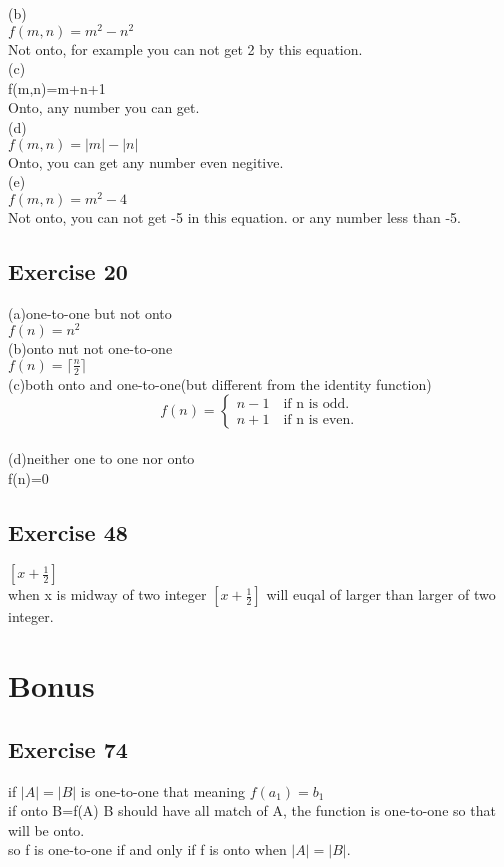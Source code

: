 \documentclass[12pt]{article}
\begin{document}
(b)\\
$f(m,n)=m^2-n^2$\\
Not onto, for example you can not get 2 by this equation.\\

(c)\\
f(m,n)=m+n+1\\
Onto, any number you can get.\\

(d)\\
$f(m,n)=|m|-|n|$\\
Onto, you can get any number even negitive.\\

(e)\\
$f(m,n)=m^2-4$\\
Not onto, you can not get -5 in this equation. or any number less than -5.\\

\subsection*{Exercise 20}
(a)one-to-one but not onto\\
$f(n)=n^2$\\

(b)onto nut not one-to-one\\
$f(n)=\lceil \frac{n}{2}\rceil$\\

(c)both onto and one-to-one(but different from the identity function)\\
$$ 
f(n)=\left \{
\begin{aligned}
n-1  \quad  \text{if n is odd.}\\
n+1   \quad  \text{if n is even.}
\end{aligned}
\right.
$$
\\
(d)neither one to one nor onto\\
f(n)=0\\

\subsection*{Exercise 48}
$[x+\frac{1}{2}]$\\
when x is midway of two integer $[x+\frac{1}{2}]$ will euqal of larger than larger of two integer.\\

\section*{Bonus}
\subsection*{Exercise 74}
if $|A|=|B|$ is one-to-one that meaning $f(a_1)=b_1$\\
if onto B=f(A) B should have all match of A, the function is one-to-one so that will be onto.\\
so f is one-to-one if and only if f is onto when $|A|=|B|$.\\
\end{document}

